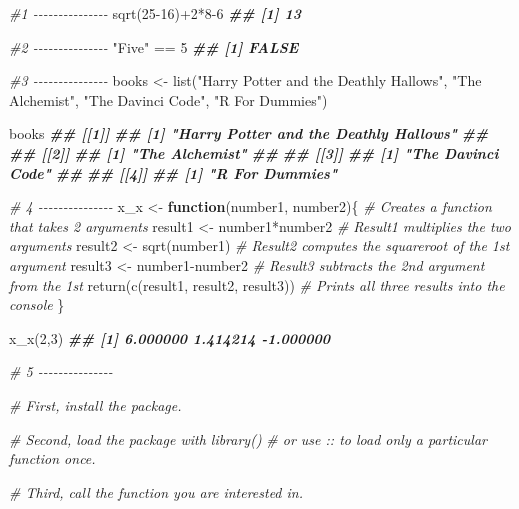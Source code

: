 \documentclass[
]{book}
\newenvironment{Shaded}{\begin{snugshade}}{\end{snugshade}}
\newcommand{\CommentTok}[1]{\textcolor[rgb]{0.56,0.35,0.01}{\textit{#1}}}
\newcommand{\ControlFlowTok}[1]{\textcolor[rgb]{0.13,0.29,0.53}{\textbf{#1}}}
\newcommand{\DecValTok}[1]{\textcolor[rgb]{0.00,0.00,0.81}{#1}}
\newcommand{\DocumentationTok}[1]{\textcolor[rgb]{0.56,0.35,0.01}{\textbf{\textit{#1}}}}
\newcommand{\FunctionTok}[1]{\textcolor[rgb]{0.00,0.00,0.00}{#1}}
\newcommand{\NormalTok}[1]{#1}
\newcommand{\OtherTok}[1]{\textcolor[rgb]{0.56,0.35,0.01}{#1}}
\newcommand{\SpecialCharTok}[1]{\textcolor[rgb]{0.00,0.00,0.00}{#1}}
\newcommand{\StringTok}[1]{\textcolor[rgb]{0.31,0.60,0.02}{#1}}
\begin{document}
\begin{Shaded}
\begin{Highlighting}[]
\CommentTok{\#1 {-}{-}{-}{-}{-}{-}{-}{-}{-}{-}{-}{-}{-}{-}{-}}
\FunctionTok{sqrt}\NormalTok{(}\DecValTok{25{-}16}\NormalTok{)}\SpecialCharTok{+}\DecValTok{2}\SpecialCharTok{*}\DecValTok{8{-}6}
\DocumentationTok{\#\# [1] 13}

\CommentTok{\#2 {-}{-}{-}{-}{-}{-}{-}{-}{-}{-}{-}{-}{-}{-}{-}}
\StringTok{"Five"} \SpecialCharTok{==} \DecValTok{5}
\DocumentationTok{\#\# [1] FALSE}

\CommentTok{\#3 {-}{-}{-}{-}{-}{-}{-}{-}{-}{-}{-}{-}{-}{-}{-}}
\NormalTok{books }\OtherTok{\textless{}{-}} \FunctionTok{list}\NormalTok{(}\StringTok{"Harry Potter and the Deathly Hallows"}\NormalTok{,}
              \StringTok{"The Alchemist"}\NormalTok{,}
              \StringTok{"The Davinci Code"}\NormalTok{,}
              \StringTok{"R For Dummies"}\NormalTok{)}

\NormalTok{books}
\DocumentationTok{\#\# [[1]]}
\DocumentationTok{\#\# [1] "Harry Potter and the Deathly Hallows"}
\DocumentationTok{\#\# }
\DocumentationTok{\#\# [[2]]}
\DocumentationTok{\#\# [1] "The Alchemist"}
\DocumentationTok{\#\# }
\DocumentationTok{\#\# [[3]]}
\DocumentationTok{\#\# [1] "The Davinci Code"}
\DocumentationTok{\#\# }
\DocumentationTok{\#\# [[4]]}
\DocumentationTok{\#\# [1] "R For Dummies"}

\CommentTok{\# 4 {-}{-}{-}{-}{-}{-}{-}{-}{-}{-}{-}{-}{-}{-}{-}}
\NormalTok{x\_x }\OtherTok{\textless{}{-}} \ControlFlowTok{function}\NormalTok{(number1, number2)\{       }\CommentTok{\# Creates a function that takes 2 arguments}
\NormalTok{  result1 }\OtherTok{\textless{}{-}}\NormalTok{ number1}\SpecialCharTok{*}\NormalTok{number2             }\CommentTok{\# Result1 multiplies the two arguments}
\NormalTok{  result2 }\OtherTok{\textless{}{-}} \FunctionTok{sqrt}\NormalTok{(number1)               }\CommentTok{\# Result2 computes the squareroot of the 1st argument}
\NormalTok{  result3 }\OtherTok{\textless{}{-}}\NormalTok{ number1}\SpecialCharTok{{-}}\NormalTok{number2             }\CommentTok{\# Result3 subtracts the 2nd argument from the 1st}
  \FunctionTok{return}\NormalTok{(}\FunctionTok{c}\NormalTok{(result1, result2, result3))   }\CommentTok{\# Prints all three results into the console}
\NormalTok{\} }

\FunctionTok{x\_x}\NormalTok{(}\DecValTok{2}\NormalTok{,}\DecValTok{3}\NormalTok{)}
\DocumentationTok{\#\# [1]  6.000000  1.414214 {-}1.000000}

\CommentTok{\# 5 {-}{-}{-}{-}{-}{-}{-}{-}{-}{-}{-}{-}{-}{-}{-}}

\CommentTok{\# First, install the package.}

\CommentTok{\# Second, load the package with \textquotesingle{}library()\textquotesingle{}}
\CommentTok{\#         or use \textquotesingle{}::\textquotesingle{} to load only a particular function once.}

\CommentTok{\# Third, call the function you are interested in.}
\end{Highlighting}
\end{Shaded}


  
\end{document}
